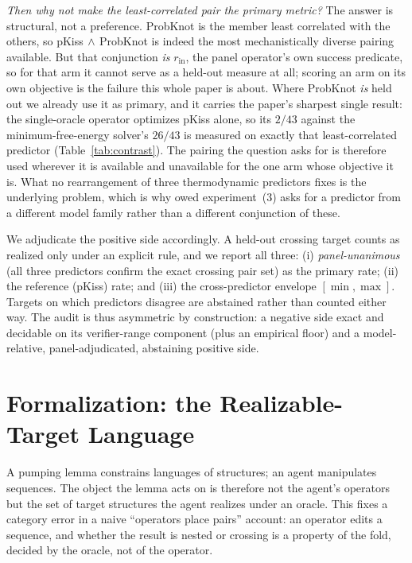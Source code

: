 \documentclass[11pt]{article}
\begin{document}
\emph{Then why not make the least-correlated pair the primary metric?} The answer is structural, not a
preference. ProbKnot is the member least correlated with the others, so pKiss$\,\wedge\,$ProbKnot is indeed
the most mechanistically diverse pairing available. But that conjunction \emph{is} $r_{\mathrm{in}}$, the
panel operator's own success predicate, so for that arm it cannot serve as a held-out measure at all; scoring
an arm on its own objective is the failure this whole paper is about. Where ProbKnot \emph{is} held out we
already use it as primary, and it carries the paper's sharpest single result: the single-oracle operator optimizes pKiss alone,
so its $2/43$ against the minimum-free-energy solver's $26/43$ is measured on exactly that least-correlated
predictor (Table~\ref{tab:contrast}). The pairing the question asks for is therefore used wherever it is
available and unavailable for the one arm whose objective it is. What no rearrangement of three thermodynamic
predictors fixes is the underlying problem, which is why owed experiment~(3) asks for a predictor from a
different model family rather than a different conjunction of these.

We adjudicate the positive side accordingly. A held-out crossing target counts as realized only under an
explicit rule, and we report all three: (i) \emph{panel-unanimous} (all three predictors confirm the exact
crossing pair set) as the primary rate; (ii) the reference (pKiss) rate; and (iii) the cross-predictor
envelope $[\min,\max]$. Targets on which predictors disagree are abstained rather than counted either way.
The audit is thus asymmetric by construction: a negative side exact and decidable on its verifier-range component (plus an empirical floor) and a model-relative,
panel-adjudicated, abstaining positive side.


\section{Formalization: the Realizable-Target Language}\label{sec:formal}
A pumping lemma constrains languages of structures; an agent manipulates sequences. The object the lemma acts
on is therefore not the agent's operators but the set of target structures the agent realizes under an
oracle. This fixes a category error in a naive ``operators place pairs'' account: an operator edits a
sequence, and whether the result is nested or crossing is a property of the fold, decided by the oracle, not
of the operator.
\end{document}

